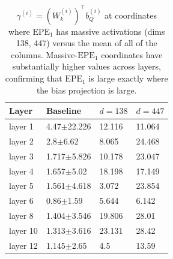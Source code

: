 \documentclass[11pt]{article}
\begin{document}
\section{} \label{app:coor_align}
\begin{table}[t]
  \centering
  \begin{tabular}{llll}
    \hline
    \textbf{Layer} & \textbf{Baseline} & \textbf{$d{=}138$} & \textbf{$d{=}447$}\\
    \hline
    layer 1   &   4.47$\pm$22.226     &    12.116   &    11.064        \\
    layer 2   &   2.8$\pm$6.62    &    8.065   &    24.468         \\
    layer 3   &   1.717$\pm$5.826 &    10.178  &    23.047        \\
    layer 4   &   1.657$\pm$5.02  &   18.198   &     17.149         \\
    layer 5   &   1.561$\pm$4.618 &    3.072   &    23.854          \\
    layer 6   &   0.86$\pm$1.59   &    5.644   &    6.142          \\
    layer 8   &   1.404$\pm$3.546 &    19.806  &    28.01          \\
    layer 10  &   1.313$\pm$3.616 &    23.131  &    28.42        \\
    layer 12   &   1.145$\pm$2.65 &    4.5  &    13.59         \\

    \hline
  \end{tabular}
  \caption{$\gamma^{(i)}=(W_k^{(i)})^\top b_Q^{(i)}$ at coordinates where $\mathrm{EPE}_1$ has massive activations (dims 138, 447) versus the mean of all of the columns. Massive-$\mathrm{EPE}_1$ coordinates have substantially higher values across layers, confirming that $\mathrm{EPE}_1$ is large exactly where the bias projection is large.}
\end{table}

\section{}\label{app:interventions}
\end{document}
